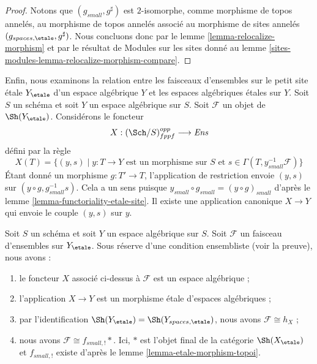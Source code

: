 \begin{proof}
Notons que $(g_{small}, g^\sharp)$ est $2$-isomorphe, comme
morphisme de topos annelés, au morphisme de topos annelés
associé au morphisme de sites annelés
$(g_{spaces, \etale}, g^\sharp)$. Nous concluons donc par le
lemme \ref{lemma-relocalize-morphism}
et par le résultat de
Modules sur les sites donné au
lemme \ref{sites-modules-lemma-relocalize-morphism-compare}.
\end{proof}

\noindent
Enfin, nous examinons la relation entre les faisceaux d'ensembles sur le petit
site \'etale $Y_\etale$ d'un espace algébrique $Y$ et les espaces algébriques
\'etales sur $Y$. Soit $S$ un schéma et soit $Y$ un espace algébrique
sur $S$. Soit $\mathcal{F}$ un objet de $\Sh(Y_\etale)$. Considérons
le foncteur
$$
X : (\Sch/S)_{fppf}^{opp} \longrightarrow \textit{Ens}
$$
défini par la règle
$$
X(T) = \{(y, s) \mid y : T \to Y\text{ est un morphisme sur }S\text{ et }
s \in \Gamma(T, y_{small}^{-1}\mathcal{F})\}
$$
Étant donné un morphisme $g : T' \to T$, l'application de restriction envoie
$(y, s)$ sur $(y \circ g, g_{small}^{-1}s)$. Cela a un sens
puisque $y_{small} \circ g_{small} = (y \circ g)_{small}$ d'après le
lemme \ref{lemma-functoriality-etale-site}. Il existe une application canonique
$X \to Y$ qui envoie le couple $(y, s)$ sur $y$.

\begin{lemma}
\label{lemma-sheaf-gives-space}
Soit $S$ un schéma et soit $Y$ un espace algébrique sur $S$.
Soit $\mathcal{F}$ un faisceau d'ensembles sur $Y_\etale$.
Sous réserve d'une condition ensembliste (voir la preuve), nous avons :
\begin{enumerate}
\item le foncteur $X$ associé ci-dessus à $\mathcal{F}$ est un
espace algébrique ;
\item l'application $X \to Y$ est un morphisme \'etale d'espaces algébriques ;
\item par l'identification $\Sh(Y_\etale) = \Sh(Y_{spaces, \etale})$,
nous avons $\mathcal{F} \cong h_X$ ;
\item nous avons $\mathcal{F} \cong f_{small, !}*$. Ici, $*$ est l'objet final
de la catégorie $\Sh(X_\etale)$ et $f_{small, !}$ existe d'après le
lemme \ref{lemma-etale-morphism-topoi}.
\end{enumerate}
\end{lemma}

